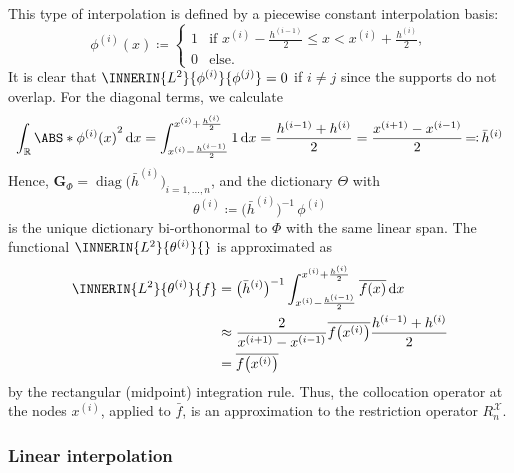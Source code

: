 \documentclass[a4paper]{paper}
\newcommand*{\SPC}[1]{{\ensuremath{\mathscr{#1}}}}
\newcommand{\RR}{{\ensuremath{\mathbb{R}}}}
\newcommand*{\REST}[2]{\ensuremath{R_{#1}^{#2}}}
\newcommand*{\RnX}{{\ensuremath{\REST{n}{\SPC{X}}}}}
\DeclareMathOperator{\DIAG}{diag}
\DeclareMathOperator{\DEFEQ}{{\coloneqq}}
\DeclareMathOperator{\EQDEF}{{\eqqcolon}}
\newcommand*{\D}[0]{\ensuremath{\mathrm{d}}}
\newcommand*{\IDX}[2]{{\ensuremath{{#2}^{(#1)}}}}
\newcommand{\vG}{\boldsymbol{G}}
\begin{document}
This type of interpolation is defined by a piecewise constant interpolation basis:
%
\begin{equation*}
 \IDX{i}{\phi}(x) \DEFEQ 
 \begin{cases}
  1 & \text{if } \IDX{i}{x} - \frac{\IDX{i-1}{h}}{2} \leq x < \IDX{i}{x} + \frac{\IDX{i}{h}}{2}, \\
  0 & \text{else}.
 \end{cases}
\end{equation*}
%
It is clear that $\INNERIN{L^2}{\IDX{i}{\phi}}{\IDX{j}{\phi}} = 0$ if $i \neq j$ since the supports do not overlap. For 
the diagonal terms, we calculate
%
\begin{equation*}
 \int_\RR \ABS*{\IDX{i}{\phi}(x)}^2\, \D x 
 = \int_{\IDX{i}{x} - \frac{\IDX{i-1}{h}}{2}}^{\IDX{i}{x} + \frac{\IDX{i}{h}}{2}} 1\, \D x
 = \frac{\IDX{i-1}{h} + \IDX{i}{h}}{2} = \frac{\IDX{i+1}{x} - \IDX{i-1}{x}}{2}
 \EQDEF \IDX{i}{\bar h}
\end{equation*}
%
Hence, $\vG_\Phi = \DIAG\big( \IDX{i}{\bar h} \big)_{i=1,\dots,n}$, and the dictionary $\Theta$ with
%
\begin{equation*}
 \IDX{i}{\theta} \DEFEQ \big( \IDX{i}{\bar h} \big)^{-1}\, \IDX{i}{\phi}
\end{equation*}
%
is the unique dictionary bi-orthonormal to $\Phi$ with the same linear span. The functional 
$\INNERIN{L^2}{\IDX{i}{\theta}}{}$ is approximated as
%
\begin{align*}
 \INNERIN{L^2}{\IDX{i}{\theta}}{f}
 &= \big( \IDX{i}{\bar h} \big)^{-1} \int_{\IDX{i}{x} - \frac{\IDX{i-1}{h}}{2}}^{\IDX{i}{x} + 
 \frac{\IDX{i}{h}}{2}} \overline{f(x)}\, \D x \\
 &\approx  \frac{2}{\IDX{i+1}{x} - \IDX{i-1}{x}} \overline{f\big( \IDX{i}{x} \big)} \frac{\IDX{i-1}{h} + \IDX{i}{h}}{2} 
 \\
 &= \overline{f\big( \IDX{i}{x} \big)}
\end{align*}
%
by the rectangular (midpoint) integration rule. Thus, the collocation operator at the nodes $\IDX{i}{x}$, applied to 
$\bar f$, is an approximation to the restriction operator $\RnX$.


\subsubsection{Linear interpolation}
\label{subsubsec:specif:interp:linear}
\end{document}

